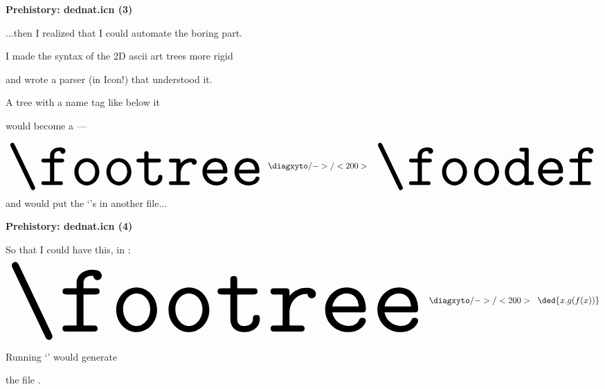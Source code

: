 \documentclass[oneside]{book}
\begin{document}
{\bf Prehistory: dednat.icn (3)}

...then I realized that I could automate the boring part.

I made the syntax of the 2D ascii art trees more rigid

and wrote a parser (in {\color{VioletDarkHard}Icon}!) that understood it.

A tree with a name tag like  below it

would become a  ---

%
%
%
%
%
\pu
$$
\myvcenter{\resizebox{!}{50pt}{\footree}}
\;\;\diagxyto/->/<200>\;\;
\myvcenter{\resizebox{!}{50pt}{\foodef}}
$$
%
and would put the `'s in another file...


\newpage


{\bf Prehistory: dednat.icn (4)}

So that I could have this, in :
%
%
%
\pu
$$
\myvcenter{\resizebox{!}{80pt}{\footree}}
\;\;\diagxyto/->/<200>\;\;
\myvcenter{\ded{x.g(f(x))}}
$$

Running `' would generate

the file .




\newpage

%                                          
\end{document}
